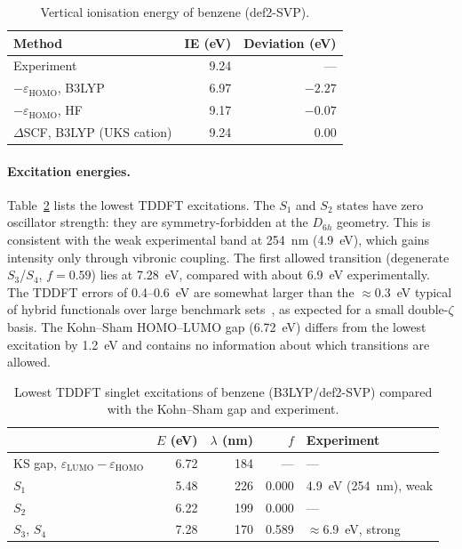 \documentclass[11pt,a4paper]{article}
\begin{document}
\begin{table}[h]
\centering\small
\caption{Vertical ionisation energy of benzene (def2-SVP).}
\label{tab:ie}
\begin{tabular}{@{}lrr@{}}
\toprule
Method & IE (eV) & Deviation (eV) \\
\midrule
Experiment & 9.24 & --- \\
$-\varepsilon_\text{HOMO}$, B3LYP & 6.97 & $-2.27$ \\
$-\varepsilon_\text{HOMO}$, HF & 9.17 & $-0.07$ \\
$\Delta$SCF, B3LYP (UKS cation) & 9.24 & $0.00$ \\
\bottomrule
\end{tabular}
\end{table}

\paragraph{Excitation energies.} Table~\ref{tab:td} lists the lowest TDDFT excitations. The
$S_1$ and $S_2$ states have zero oscillator strength: they are symmetry-forbidden at the $D_{6h}$
geometry. This is consistent with the weak experimental band at 254~nm (4.9~eV), which gains
intensity only through vibronic coupling. The first allowed transition (degenerate $S_3$/$S_4$,
$f = 0.59$) lies at 7.28~eV, compared with about 6.9~eV experimentally. The TDDFT errors of
0.4--0.6~eV are somewhat larger than the $\approx$0.3~eV typical of hybrid functionals over
large benchmark sets~\cite{jacquemin2009}, as expected for a small double-$\zeta$ basis.
The Kohn--Sham HOMO--LUMO gap (6.72~eV) differs from the lowest excitation by 1.2~eV and contains
no information about which transitions are allowed.

\begin{table}[h]
\centering\small
\caption{Lowest TDDFT singlet excitations of benzene (B3LYP/def2-SVP) compared with the
Kohn--Sham gap and experiment.}
\label{tab:td}
\begin{tabular}{@{}lrrrl@{}}
\toprule
& $E$ (eV) & $\lambda$ (nm) & $f$ & Experiment \\
\midrule
KS gap, $\varepsilon_\text{LUMO}-\varepsilon_\text{HOMO}$ & 6.72 & 184 & --- & --- \\
$S_1$ & 5.48 & 226 & 0.000 & 4.9~eV (254~nm), weak \\
$S_2$ & 6.22 & 199 & 0.000 & --- \\
$S_3$, $S_4$ & 7.28 & 170 & 0.589 & $\approx$6.9~eV, strong \\
\bottomrule
\end{tabular}
\end{table}
\end{document}
